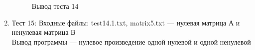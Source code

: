 \documentclass[12pt, a4paper]{article}
\begin{document}
\begin{enumerate}
\begin{figure}[h]
  		\caption{Вывод теста 14}
	\end{figure}
	\newpage
	\item Тест 15: Входные файлы: test14.1.txt, 
	matrix5.txt --- нулевая матрица А и ненулевая матрица 
	В\\
	Вывод программы --- нулевое произведение одной нулевой и одной ненулевой 

\end{enumerate}
\end{document}
